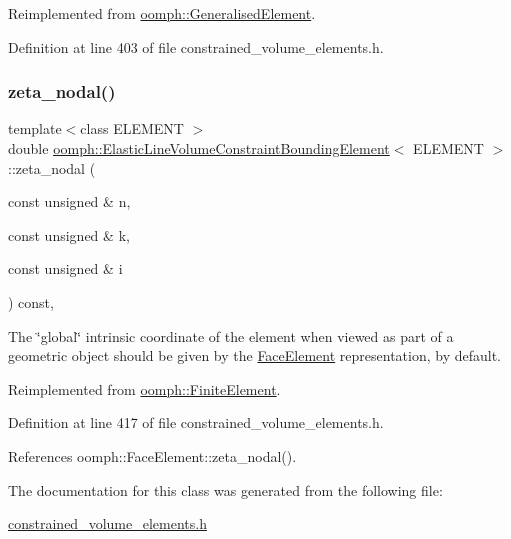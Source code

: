 Reimplemented from \hyperlink{classoomph_1_1GeneralisedElement_a6ae09fc0d68e4309ac1b03583d252845}{oomph\+::\+Generalised\+Element}.



Definition at line 403 of file constrained\+\_\+volume\+\_\+elements.\+h.

\mbox{\label{classoomph_1_1ElasticLineVolumeConstraintBoundingElement_a99fee8b9d2bea757909174f26415139b}} 
\subsubsection{\texorpdfstring{zeta\+\_\+nodal()}{zeta\_nodal()}}
{\footnotesize\ttfamily template$<$class E\+L\+E\+M\+E\+NT $>$ \\
double \hyperlink{classoomph_1_1ElasticLineVolumeConstraintBoundingElement}{oomph\+::\+Elastic\+Line\+Volume\+Constraint\+Bounding\+Element}$<$ E\+L\+E\+M\+E\+NT $>$\+::zeta\+\_\+nodal (\begin{DoxyParamCaption}\item[{const unsigned \&}]{n,  }\item[{const unsigned \&}]{k,  }\item[{const unsigned \&}]{i }\end{DoxyParamCaption}) const\hspace{0.3cm}{\ttfamily [inline]}, {\ttfamily [virtual]}}



The \char`\"{}global\char`\"{} intrinsic coordinate of the element when viewed as part of a geometric object should be given by the \hyperlink{classoomph_1_1FaceElement}{Face\+Element} representation, by default. 



Reimplemented from \hyperlink{classoomph_1_1FiniteElement_a849561c5fbcbc07dc49d2dc6cca68559}{oomph\+::\+Finite\+Element}.



Definition at line 417 of file constrained\+\_\+volume\+\_\+elements.\+h.



References oomph\+::\+Face\+Element\+::zeta\+\_\+nodal().



The documentation for this class was generated from the following file\+:\begin{DoxyCompactItemize}
\item 
\hyperlink{constrained__volume__elements_8h}{constrained\+\_\+volume\+\_\+elements.\+h}\end{DoxyCompactItemize}
